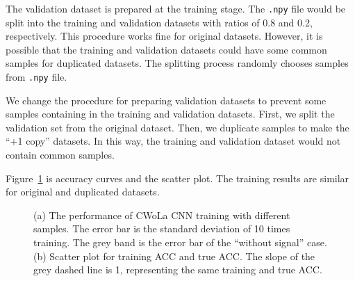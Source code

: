 \documentclass[12pt]{article}
\begin{document}
		The validation dataset is prepared at the training stage. The \verb|.npy| file would be split into the training and validation datasets with ratios of 0.8 and 0.2, respectively. This procedure works fine for original datasets. However, it is possible that the training and validation datasets could have some common samples for duplicated datasets. The splitting process randomly chooses samples from \verb|.npy| file.

		We change the procedure for preparing validation datasets to prevent some samples containing in the training and validation datasets. First, we split the validation set from the original dataset. Then, we duplicate samples to make the ``+1 copy'' datasets. In this way, the training and validation dataset would not contain common samples.

		Figure~\ref{fig:acc_curve_split_validation_first} is accuracy curves and the scatter plot. The training results are similar for original and duplicated datasets.
		\begin{figure}[htpb]
			\centering
			\caption{(a) The performance of CWoLa CNN training with different samples. The error bar is the standard deviation of 10 times training. The grey band is the error bar of the ``without signal'' case. (b) Scatter plot for training ACC and true ACC. The slope of the grey dashed line is 1, representing the same training and true ACC.}
			\label{fig:acc_curve_split_validation_first}
		\end{figure}
		
\end{document}
